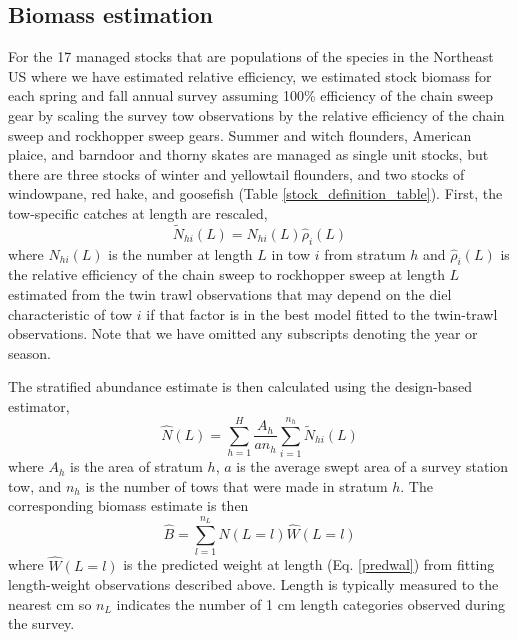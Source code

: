 \documentclass[
  12pt,
]{article}
\begin{document}
\hypertarget{biomass-estimation}{%
\subsection{Biomass estimation}\label{biomass-estimation}}

For the 17 managed stocks that are populations of the species in the
Northeast US where we have estimated relative efficiency, we estimated
stock biomass for each spring and fall annual survey assuming 100\%
efficiency of the chain sweep gear by scaling the survey tow
observations by the relative efficiency of the chain sweep and
rockhopper sweep gears. Summer and witch flounders, American plaice, and
barndoor and thorny skates are managed as single unit stocks, but there
are three stocks of winter and yellowtail flounders, and two stocks of
windowpane, red hake, and goosefish (Table
\ref{stock_definition_table}). First, the tow-specific catches at length
are rescaled, \begin{equation}\label{nal}
\widetilde N_{hi}\left(L\right) = N_{hi}\left(L\right)\widehat \rho_i\left(L\right)
\end{equation} where \(N_{hi}(L)\) is the number at length \(L\) in tow
\(i\) from stratum \(h\) and \(\widehat \rho_i\left(L\right)\) is the
relative efficiency of the chain sweep to rockhopper sweep at length
\(L\) estimated from the twin trawl observations that may depend on the
diel characteristic of tow \(i\) if that factor is in the best model
fitted to the twin-trawl observations. Note that we have omitted any
subscripts denoting the year or season.

The stratified abundance estimate is then calculated using the
design-based estimator, \begin{equation}\label{Nal_estimate}
 \widehat N(L) = \sum^H_{h=1} \frac{A_h}{an_h}\sum^{n_h}_{i=1} \widetilde N_{hi}(L)
\end{equation} where \(A_h\) is the area of stratum \(h\), \(a\) is the
average swept area of a survey station tow, and \(n_h\) is the number of
tows that were made in stratum \(h\). The corresponding biomass estimate
is then \begin{equation}\label{biomass_estimate}
 \widehat B = \sum^{n_L}_{l=1} \widehat N(L = l) \widehat W(L=l)
\end{equation} where \(\widehat W(L=l)\) is the predicted weight at
length (Eq. \ref{predwal}) from fitting length-weight observations
described above. Length is typically measured to the nearest cm so
\(n_L\) indicates the number of 1 cm length categories observed during
the survey.
\end{document}
